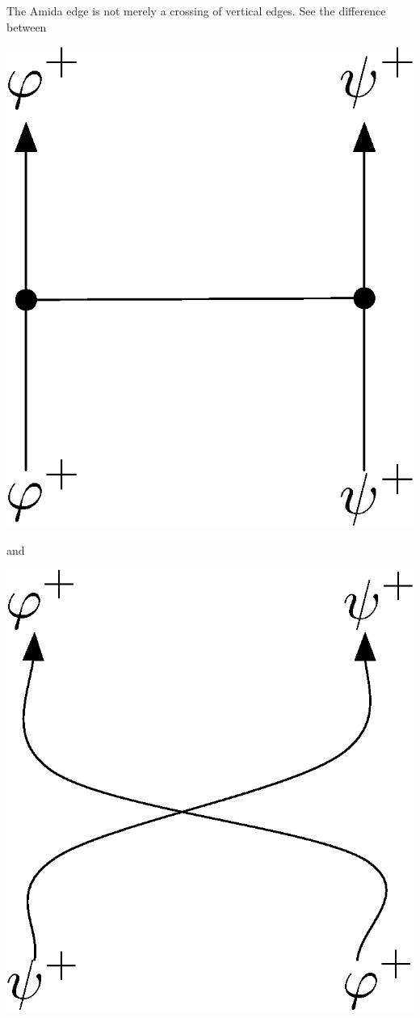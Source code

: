  The Amida edge is not merely a crossing of vertical edges.
 See the difference between
 \begin{center}
\includegraphics[scale=0.4]{twoedges_amida_without_label.eps}
 \end{center}
and
 \begin{center}
\includegraphics[scale=0.4]{crossing.eps}
 \end{center}
